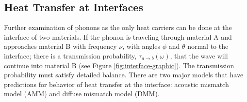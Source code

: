 \subsection{Heat Transfer at Interfaces}
Further examination of phonons as the only heat carriers can be done at the interface of two materials. If the phonon is traveling through material A and approaches material B with frequency $\nu$, with angles $\phi$ and $\theta$ normal to the interface; there is a transmission probability, $\tau_{a\rightarrow b}(\omega)$, that the wave will continue into material B (see Figure \ref{fig:interface-graphic}).\cite{Monachon2016} 
The transmission probability must satisfy detailed balance.
There are two major models that have predictions for behavior of heat transfer at the interface: acoustic mismatch model (AMM) and diffuse mismatch model (DMM).\cite{Monachon2016}
